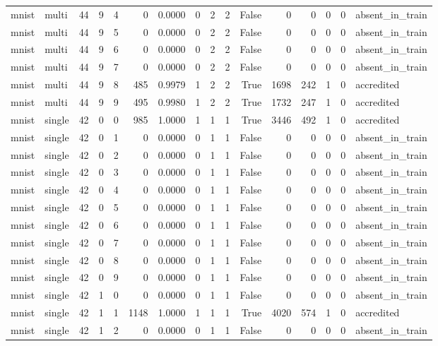 \begin{tabular}{llrrrrrrrrrrrrrl}
mnist & multi & 44 & 9 & 4 & 0 & 0.0000 & 0 & 2 & 2 & False & 0 & 0 & 0 & 0 & absent\_in\_train \\
mnist & multi & 44 & 9 & 5 & 0 & 0.0000 & 0 & 2 & 2 & False & 0 & 0 & 0 & 0 & absent\_in\_train \\
mnist & multi & 44 & 9 & 6 & 0 & 0.0000 & 0 & 2 & 2 & False & 0 & 0 & 0 & 0 & absent\_in\_train \\
mnist & multi & 44 & 9 & 7 & 0 & 0.0000 & 0 & 2 & 2 & False & 0 & 0 & 0 & 0 & absent\_in\_train \\
mnist & multi & 44 & 9 & 8 & 485 & 0.9979 & 1 & 2 & 2 & True & 1698 & 242 & 1 & 0 & accredited \\
mnist & multi & 44 & 9 & 9 & 495 & 0.9980 & 1 & 2 & 2 & True & 1732 & 247 & 1 & 0 & accredited \\
mnist & single & 42 & 0 & 0 & 985 & 1.0000 & 1 & 1 & 1 & True & 3446 & 492 & 1 & 0 & accredited \\
mnist & single & 42 & 0 & 1 & 0 & 0.0000 & 0 & 1 & 1 & False & 0 & 0 & 0 & 0 & absent\_in\_train \\
mnist & single & 42 & 0 & 2 & 0 & 0.0000 & 0 & 1 & 1 & False & 0 & 0 & 0 & 0 & absent\_in\_train \\
mnist & single & 42 & 0 & 3 & 0 & 0.0000 & 0 & 1 & 1 & False & 0 & 0 & 0 & 0 & absent\_in\_train \\
mnist & single & 42 & 0 & 4 & 0 & 0.0000 & 0 & 1 & 1 & False & 0 & 0 & 0 & 0 & absent\_in\_train \\
mnist & single & 42 & 0 & 5 & 0 & 0.0000 & 0 & 1 & 1 & False & 0 & 0 & 0 & 0 & absent\_in\_train \\
mnist & single & 42 & 0 & 6 & 0 & 0.0000 & 0 & 1 & 1 & False & 0 & 0 & 0 & 0 & absent\_in\_train \\
mnist & single & 42 & 0 & 7 & 0 & 0.0000 & 0 & 1 & 1 & False & 0 & 0 & 0 & 0 & absent\_in\_train \\
mnist & single & 42 & 0 & 8 & 0 & 0.0000 & 0 & 1 & 1 & False & 0 & 0 & 0 & 0 & absent\_in\_train \\
mnist & single & 42 & 0 & 9 & 0 & 0.0000 & 0 & 1 & 1 & False & 0 & 0 & 0 & 0 & absent\_in\_train \\
mnist & single & 42 & 1 & 0 & 0 & 0.0000 & 0 & 1 & 1 & False & 0 & 0 & 0 & 0 & absent\_in\_train \\
mnist & single & 42 & 1 & 1 & 1148 & 1.0000 & 1 & 1 & 1 & True & 4020 & 574 & 1 & 0 & accredited \\
mnist & single & 42 & 1 & 2 & 0 & 0.0000 & 0 & 1 & 1 & False & 0 & 0 & 0 & 0 & absent\_in\_train \\

\end{tabular}
